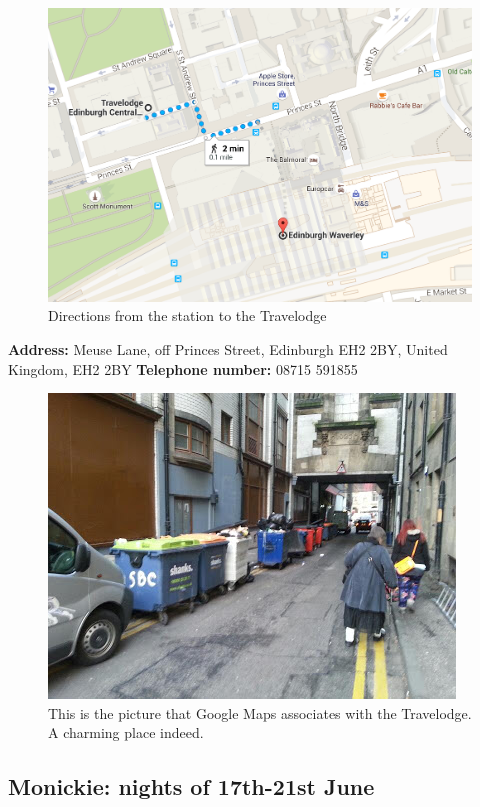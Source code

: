\documentclass[12pt,letterpaper]{article}
\begin{document}
\begin{figure}[h!]
\caption{Directions from the station to the Travelodge}
\includegraphics[scale=0.6]{Ed_direc}
\centering
\end{figure}

\textbf{Address:} Meuse Lane, off Princes Street, Edinburgh EH2 2BY, United Kingdom, EH2 2BY
\textbf{Telephone number:} 08715 591855

\begin{figure}[h!]
\caption{This is the picture that Google Maps associates with the Travelodge. A charming place indeed.}
\includegraphics[scale=1]{Travelodge}
\centering
\end{figure}

\subsection{Monickie: nights of 17th-21st June}
\end{document}
